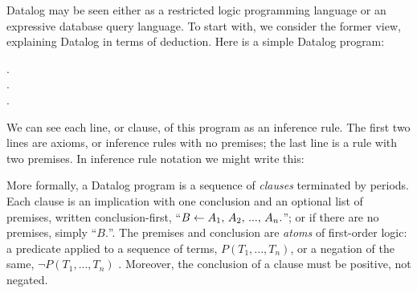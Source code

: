 
Datalog may be seen either as a restricted logic programming language or an
expressive database query language. To start with, we consider the former view,
explaining Datalog in terms of deduction. Here is a simple Datalog program:

\begin{datalog}
  .
  \\
  .
  \\
   \gets {} \conj {}.
\end{datalog}

\noindent
We can see each line, or clause, of this program as an inference rule. The first
two lines are axioms, or inference rules with no premises; the last line is a
rule with two premises. In inference rule notation we might write this:
%
\begin{mathpar}


\end{mathpar}

\noindent
More formally, a Datalog program is a sequence of \emph{clauses} terminated by
periods. Each clause is an implication with one conclusion and an optional list
of premises, written conclusion-first, ``$B \gets A_1 \conj A_2 \conj ... \conj
A_n.$''; or if there are no premises, simply ``$B.$''. The premises and
conclusion are \emph{atoms} of first-order logic: a predicate applied to a
sequence of terms, $P(T_1, ..., T_n)$, or a negation of the same, $\neg P(T_1,
..., T_n)$%
.
%
%
Moreover, the conclusion of a clause must be positive, not negated.
%

